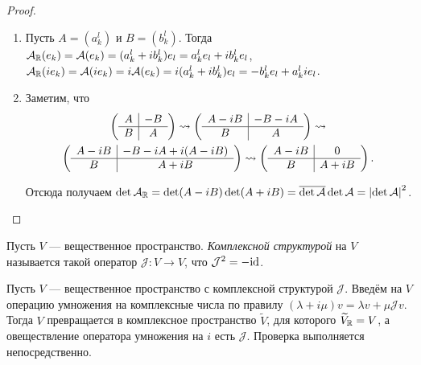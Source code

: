 \begin{proof}
    \begin{enumerate}
        \item Пусть $A = (a^l_k)$ и $B = (b^l_k)$. Тогда $\mathcal{A}_{\mathbb{R}}(e_k) = \mathcal{A}(e_k) = (a^l_k + ib^l_k)e_l = a^l_ke_l + ib^l_ke_l$, $\mathcal{A}_{\mathbb{R}}(ie_k) = \mathcal{A}(ie_k) = i\mathcal{A}(e_k) = i(a^l_k + ib^l_k)e_l = -b^l_ke_l + a^l_kie_l$.
        \item Заметим, что
            \begin{multline*}
                \left(
                \begin{array}{c | c}
                    A & -B\\
                    \hline
                    B & A
                \end{array}
                \right) \leadsto
                \left(
                \begin{array}{c | c}
                    A - iB & -B - iA\\
                    \hline
                    B & A
                \end{array}
                \right) \leadsto\\
                \left(
                \begin{array}{c | c}
                    A - iB & -B - iA + i(A - iB)\\
                    \hline
                    B & A + iB
                \end{array}
                \right) \leadsto
                \left(
                \begin{array}{c | c}
                    A - iB & 0\\
                    \hline
                    B & A + iB
                \end{array}
                \right).
            \end{multline*}

            Отсюда получаем $\det\mathcal{A}_{\mathbb{R}} = \det(A - iB)\det(A + iB) = \overline{\det\mathcal{A}}\det\mathcal{A} = \left\lvert\det\mathcal{A}\right\rvert^2$.
    \end{enumerate}
\end{proof}

\begin{definition}
    Пусть $V$ --- вещественное пространство. \textit{Комплексной структурой} на $V$ называется такой оператор $\mathcal{J}: V \to V$, что $\mathcal{J}^2 = -\mathrm{id}$.
\end{definition}

Пусть $V$ --- вещественное пространство с комплексной структурой $\mathcal{J}$. Введём на $V$ операцию умножения на комплексные числа по правилу $(\lambda + i\mu)v = \lambda v + \mu\mathcal{J}v$. Тогда $V$ превращается в комплексное пространство $\widetilde{V}$, для которого $\widetilde{V}_{\mathbb{R}} = V$, а овеществление оператора умножения на $i$ есть $\mathcal{J}$. Проверка выполняется непосредственно.


